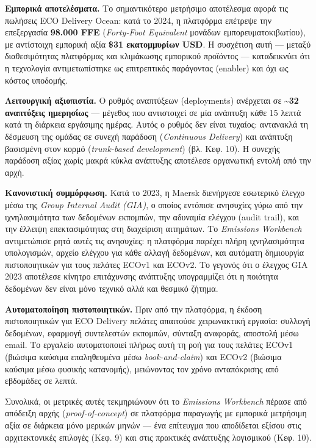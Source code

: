 \documentclass[11pt,a4paper,greek,twoside]{template-xe}
\begin{document}
\textbf{Εμπορικά αποτελέσματα.} Το σημαντικότερο μετρήσιμο αποτέλεσμα
αφορά τις πωλήσεις ECO Delivery Ocean: κατά το 2024, η πλατφόρμα
επέτρεψε την επεξεργασία \textbf{98.000 FFE} (\emph{Forty-Foot
Equivalent} μονάδων εμπορευματοκιβωτίου), με αντίστοιχη εμπορική αξία
\textbf{\$31 εκατομμυρίων USD}. Η συσχέτιση αυτή --- μεταξύ
διαθεσιμότητας πλατφόρμας και κλιμάκωσης εμπορικού προϊόντος ---
καταδεικνύει ότι η τεχνολογία αντιμετωπίστηκε ως επιτρεπτικός παράγοντας
(enabler) και όχι ως κόστος υποδομής.

\textbf{Λειτουργική αξιοπιστία.} Ο ρυθμός αναπτύξεων (deployments)
ανέρχεται σε \textbf{\textasciitilde32 αναπτύξεις ημερησίως} --- μέγεθος
που αντιστοιχεί σε μία ανάπτυξη κάθε 15 λεπτά κατά τη διάρκεια εργάσιμης
ημέρας. Αυτός ο ρυθμός δεν είναι τυχαίος: αντανακλά τη δέσμευση της
ομάδας σε συνεχή παράδοση (\emph{Continuous Delivery}) και ανάπτυξη
βασισμένη στον κορμό (\emph{trunk-based development}) (βλ. Κεφ. 10). Η
συνεχής παράδοση αξίας χωρίς μακρά κύκλα ανάπτυξης αποτέλεσε οργανωτική
εντολή από την αρχή.

\textbf{Κανονιστική συμμόρφωση.} Κατά το 2023, η Maersk διενήργεσε
εσωτερικό έλεγχο μέσω της \emph{Group Internal Audit (GIA)}, ο οποίος
εντόπισε ανησυχίες γύρω από την ιχνηλασιμότητα των δεδομένων εκπομπών,
την αδυναμία ελέγχου (audit trail), και την έλλειψη επεκτασιμότητας στη
διαχείριση αιτημάτων. Το \emph{Emissions Workbench} αντιμετώπισε ρητά
αυτές τις ανησυχίες: η πλατφόρμα παρέχει πλήρη ιχνηλασιμότητα
υπολογισμών, αρχείο ελέγχου για κάθε αλλαγή δεδομένων, και αυτόματη
δημιουργία πιστοποιητικών για τους πελάτες ECOv1 και ECOv2. Το γεγονός
ότι ο έλεγχος GIA 2023 αποτέλεσε κίνητρο επιτάχυνσης ανάπτυξης
υπογραμμίζει ότι η ποιότητα δεδομένων δεν είναι μόνο τεχνικό αλλά και
θεσμικό ζήτημα.

\textbf{Αυτοματοποίηση πιστοποιητικών.} Πριν από την πλατφόρμα, η έκδοση
πιστοποιητικών για ECO Delivery πελάτες απαιτούσε χειρωνακτική εργασία:
συλλογή δεδομένων, εφαρμογή συντελεστών εκπομπών, σύνταξη αναφοράς,
αποστολή μέσω email. Το εργαλείο αυτοματοποιεί πλήρως αυτή τη ροή για
τους πελάτες ECOv1 (βιώσιμα καύσιμα επαληθευμένα μέσω
\emph{book-and-claim}) και ECOv2 (βιώσιμα καύσιμα μέσω φυσικής
κατανομής), μειώνοντας τον χρόνο ανταπόκρισης από εβδομάδες σε λεπτά.

Συνολικά, οι μετρικές αυτές τεκμηριώνουν ότι το \emph{Emissions
Workbench} πέρασε από απόδειξη αρχής (\emph{proof-of-concept}) σε
πλατφόρμα παραγωγής με εμπορικά μετρήσιμη αξία σε διάρκεια μόνο μερικών
μηνών --- ένα επίτευγμα που αποδίδεται εξίσου στις αρχιτεκτονικές
επιλογές (Κεφ. 9) και στις πρακτικές ανάπτυξης λογισμικού (Κεφ. 10).
\end{document}
